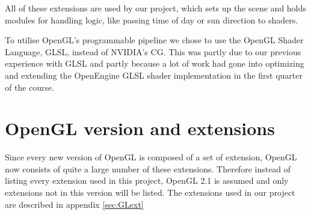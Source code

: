 All of these extensions are used by our  project, which
sets up the scene and holds modules for handling logic, like passing time of
day or sun direction to shaders.


To utilise OpenGL's programmable pipeline we chose to use the OpenGL
Shader Language, GLSL, instead of NVIDIA's CG. This was partly due to
our previous experience with GLSL and partly because a lot of work had
gone into optimizing and extending the OpenEngine GLSL shader
implementation in the first quarter of the course.

\section{OpenGL version and extensions}

Since every new version of OpenGL is composed of a set of extension,
OpenGL now consists of quite a large number of these
extensions. Therefore instead of listing every extension used in this
project, OpenGL 2.1 is assumed and only extensions not in this version
will be listed. The extensions used in our project are described in
appendix \ref{sec:GLext}

